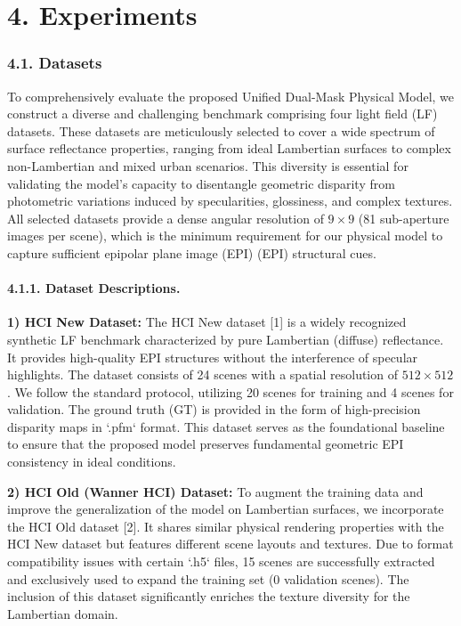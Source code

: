 \section{4. Experiments}

\subsubsection{4.1. Datasets}

To comprehensively evaluate the proposed Unified Dual-Mask Physical Model, we construct a diverse and challenging benchmark comprising four light field (LF) datasets. These datasets are meticulously selected to cover a wide spectrum of surface reflectance properties, ranging from ideal Lambertian surfaces to complex non-Lambertian and mixed urban scenarios. This diversity is essential for validating the model's capacity to disentangle geometric disparity from photometric variations induced by specularities, glossiness, and complex textures. All selected datasets provide a dense angular resolution of $9 \times 9$ (81 sub-aperture images per scene), which is the minimum requirement for our physical model to capture sufficient epipolar plane image (EPI) (EPI) structural cues.

\paragraph{4.1.1. Dataset Descriptions.}

\textbf{1) HCI New Dataset:} 
The HCI New dataset [1] is a widely recognized synthetic LF benchmark characterized by pure Lambertian (diffuse) reflectance. It provides high-quality EPI structures without the interference of specular highlights. The dataset consists of 24 scenes with a spatial resolution of $512 \times 512$. We follow the standard protocol, utilizing 20 scenes for training and 4 scenes for validation. The ground truth (GT) is provided in the form of high-precision disparity maps in `.pfm` format. This dataset serves as the foundational baseline to ensure that the proposed model preserves fundamental geometric EPI consistency in ideal conditions.

\textbf{2) HCI Old (Wanner HCI) Dataset:} 
To augment the training data and improve the generalization of the model on Lambertian surfaces, we incorporate the HCI Old dataset [2]. It shares similar physical rendering properties with the HCI New dataset but features different scene layouts and textures. Due to format compatibility issues with certain `.h5` files, 15 scenes are successfully extracted and exclusively used to expand the training set (0 validation scenes). The inclusion of this dataset significantly enriches the texture diversity for the Lambertian domain.

